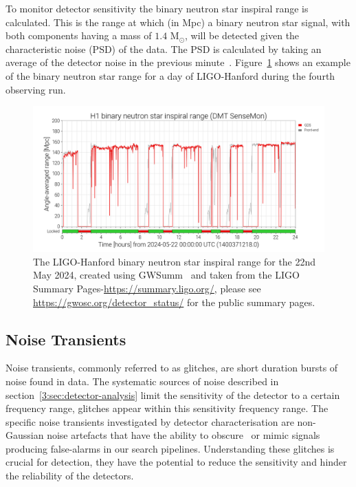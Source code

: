 To monitor detector sensitivity the binary neutron star inspiral range is calculated. This is the range at which (in Mpc) a binary neutron star signal, with both components having a mass of $1.4$ M$_{\odot}$, will be detected given the characteristic noise (PSD) of the data. The PSD is calculated by taking an average of the detector noise in the previous minute~\cite{range_calculation:2003, ota:2023}. Figure~\ref{3:fig:bns_range} shows an example of the binary neutron star range for a day of LIGO-Hanford during the fourth observing run.
%
\begin{figure}
    \centering
    \includegraphics[width=1\linewidth]{images/3_detector_characterisation/may22_bns_range.png}
    \caption{The LIGO-Hanford binary neutron star inspiral range for the 22nd May 2024, created using GWSumm~\cite{gwsumm:2024} and taken from the LIGO Summary Pages-\href{https://summary.ligo.org/}{https://summary.ligo.org/}, please see \href{https://gwosc.org/detector_status/}{https://gwosc.org/detector\_status/} for the public summary pages.}
    \label{3:fig:bns_range}
\end{figure}
%

\subsection{\label{3:sec:noise-transients}Noise Transients}


Noise transients, commonly referred to as glitches, are short duration bursts of noise found in \gwadj data. The systematic sources of noise described in section~\ref{3:sec:detector-analysis} limit the sensitivity of the detector to a certain frequency range, glitches appear within this sensitivity frequency range. The specific noise transients investigated by detector characterisation are non-Gaussian noise artefacts that have the ability to obscure~\cite{GW170817:2017} or mimic \gwadj signals~\cite{GWMimicking:2010} producing false-alarms in our \gwadj search pipelines. Understanding these glitches is crucial for \gwadj detection, they have the potential to reduce the sensitivity and hinder the reliability of the detectors.
%
%

